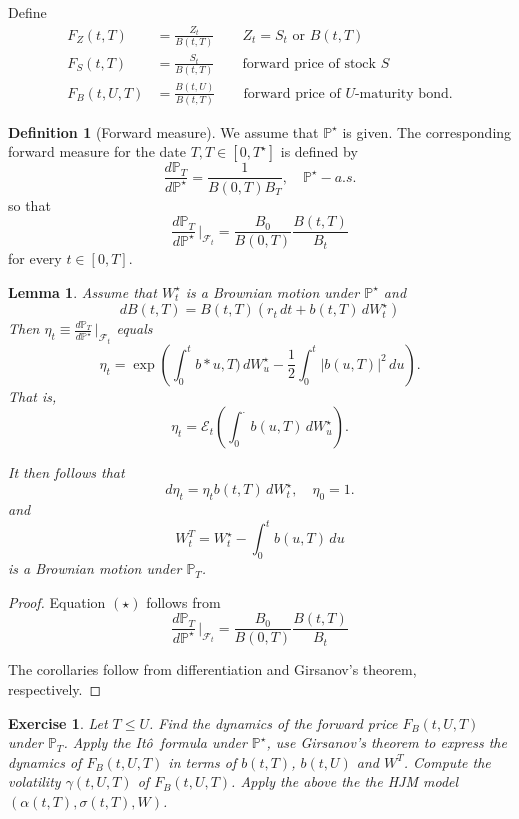 \documentclass[10pt, oneside, reqno]{amsbook}
\theoremstyle{plain}%
\newtheorem{lem}[thm]{Lemma}
\newtheorem{exer}[thm]{Exercise}
\theoremstyle{definition}
\newtheorem{defn}[thm]{Definition}
\theoremstyle{remark}
\newcommand{\sigf}{\mathcal{F}}
\renewcommand{\P}{\mathbb{P}}
\newcommand{\ito}{It\^o\ }
\newcommand{\doleans}[1]{\mathcal E_t \left(\int_0^\cdot #1 \right)}
\numberwithin{equation}{chapter}
\begin{document}
Define \begin{align*}
	F_Z(t, T) &= \frac{Z_t}{B(t, T)} \qquad \text{$Z_t = S_t$ or $B(t, T)$} \\
	F_S(t, T) &= \frac{S_t}{B(t, T)} \qquad \text{forward price of stock $S$}\\
	F_B(t, U, T) &= \frac{B(t, U)}{B(t, T)} \qquad \text{forward price of $U$-maturity bond}.
\end{align*}

\begin{defn}[Forward measure]
	
	We assume that $\P^\star$ is given.  The corresponding forward measure for the date $T, T \in [0, T^\star]$ is defined by \[
		\frac{d\P_T}{d\P^\star} = \frac{1}{B(0,T) B_T}, \quad \P^\star-a.s.
	\] so that \[
		\frac{d\P_T}{d\P^\star} \, |_{\sigf_t} = \frac{B_0}{B(0, T)} \frac{B(t, T)}{B_t}
	\] for every $t \in [0, T]$.
\end{defn}

\begin{lem}
	Assume that $W_t^\star$ is a Brownian motion under $\P^\star$ and \[
		dB(t, T) = B(t, T) \left( r_t \, dt + b(t, T) \, dW^\star_t \right)
	\]  Then $\eta_t \equiv \frac{d\P_T}{d\P^\star} \, |_{\sigf_t}$ equals \[
		\eta_t = \exp \left( \int_0^t b*u, T) \, dW^\star_u - \frac{1}{2} \int_0^t \left| b(u, T) \right|^2 \, du \right).
	\]  That is, \[
		\eta_t = \doleans{b(u, T) \, dW^\star_u}. 
		\tag{$\star$}
	\]  
	
	It then follows that \[
		d \eta_t = \eta_t b(t, T) \, dW^\star_t, \quad \eta_0 = 1.
	\] and \[
		W_t^T = W^\star_t - \int_0^t b(u, T) \, du
	\] is a Brownian motion under $\P_T$.
\end{lem}

\begin{proof}
	Equation $(\star)$ follows from \[
		\frac{d\P_T}{d\P^\star} \, |_{\sigf_t} = \frac{B_0}{B(0, T)} \frac{B(t, T)}{B_t}
	\]  
	
	The corollaries follow from differentiation and Girsanov's theorem, respectively.
\end{proof}

\begin{exer}
	Let $T \leq U$.  Find the dynamics of the forward price $F_B(t, U , T)$ under $\P_T$.  Apply the \ito formula under $\P^\star$, use Girsanov's theorem to express the dynamics of $F_B(t, U, T)$ in terms of $b(t, T)$, $b(t, U)$ and $W^T$.  Compute the volatility $\gamma(t, U ,T)$ of $F_B(t, U, T)$.  Apply the above the the HJM model $(\alpha(t, T), \sigma(t, T), W)$.
\end{exer}
\end{document}
